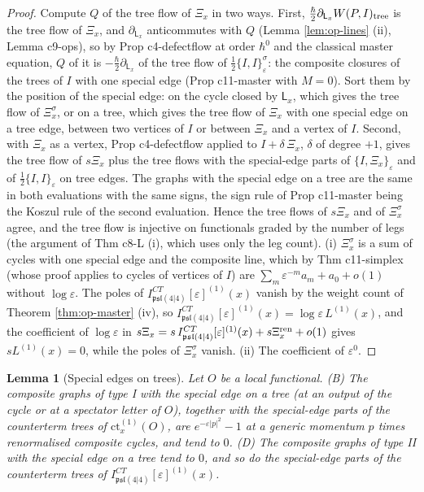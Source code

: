 \documentclass[11pt]{article}
\numberwithin{equation}{section}
\theoremstyle{plain}
\newtheorem{lemma}[theorem]{Lemma}
\theoremstyle{definition}
\newcommand{\psl}{\mathfrak{psl}(4|4)}
\newcommand{\ct}{\mathrm{ct}}
\begin{document}
\begin{proof}
Compute $Q$ of the tree flow of $\Xi_x$ in two ways. First, $\tfrac\hbar2\partial_{\mathsf L_x}W(P,I)_{\rm tree}$ is the tree flow of $\Xi_x$, and $\partial_{\mathsf L_x}$ anticommutes with $Q$ (Lemma \ref{lem:op-lines} (ii), Lemma c9-ops), so by Prop c4-defectflow at order $\hbar^0$ and the classical master equation, $Q$ of it is $-\tfrac\hbar2\partial_{\mathsf L_x}$ of the tree flow of $\tfrac12\{I,I\}^\sigma_\varepsilon$: the composite closures of the trees of $I$ with one special edge (Prop c11-master with $M=0$). Sort them by the position of the special edge: on the cycle closed by $\mathsf L_x$, which gives the tree flow of $\Xi^\sigma_x$, or on a tree, which gives the tree flow of $\Xi_x$ with one special edge on a tree edge, between two vertices of $I$ or between $\Xi_x$ and a vertex of $I$. Second, with $\Xi_x$ as a vertex, Prop c4-defectflow applied to $I+\delta\,\Xi_x$, $\delta$ of degree $+1$, gives the tree flow of $s\Xi_x$ plus the tree flows with the special-edge parts of $\{I,\Xi_x\}_\varepsilon$ and of $\tfrac12\{I,I\}_\varepsilon$ on tree edges. The graphs with the special edge on a tree are the same in both evaluations with the same signs, the sign rule of Prop c11-master being the Koszul rule of the second evaluation. Hence the tree flows of $s\Xi_x$ and of $\Xi^\sigma_x$ agree, and the tree flow is injective on functionals graded by the number of legs (the argument of Thm c8-L (i), which uses only the leg count). (i) $\Xi^\sigma_x$ is a sum of cycles with one special edge and the composite line, which by Thm c11-simplex (whose proof applies to cycles of vertices of $I$) are $\sum_m\varepsilon^{-m}a_m+a_0+o(1)$ without $\log\varepsilon$. The poles of $I^{CT}_{\psl}[\varepsilon]^{(1)}(x)$ vanish by the weight count of Theorem \ref{thm:op-master} (iv), so $I^{CT}_{\psl}[\varepsilon]^{(1)}(x)=\log\varepsilon\,L^{(1)}(x)$, and the coefficient of $\log\varepsilon$ in $s\Xi_x=s\,I^{CT}_{\psl}[\varepsilon]^{(1)}(x)+s\Xi^{\rm ren}_x+o(1)$ gives $sL^{(1)}(x)=0$, while the poles of $\Xi^\sigma_x$ vanish. (ii) The coefficient of $\varepsilon^0$.
\end{proof}

\begin{lemma}[Special edges on trees]
\label{lem:op-BD}
Let $O$ be a local functional. (B) The composite graphs of type I with the special edge on a tree (at an output of the cycle or at a spectator letter of $O$), together with the special-edge parts of the counterterm trees of $\ct^{(1)}_x(O)$, are $e^{-\varepsilon|p|^2}-1$ at a generic momentum $p$ times renormalised composite cycles, and tend to $0$. (D) The composite graphs of type II with the special edge on a tree tend to $0$, and so do the special-edge parts of the counterterm trees of $I^{CT}_{\psl}[\varepsilon]^{(1)}(x)$.
\end{lemma}
\end{document}
